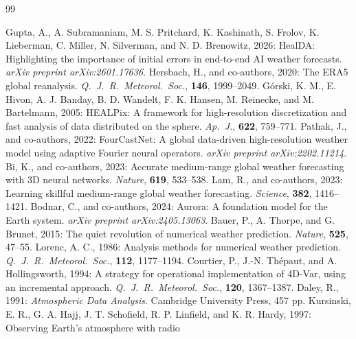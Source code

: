 \documentclass[twocolumn,11pt]{article}
\begin{document}
\begin{thebibliography}{99}\small

Gupta, A., A. Subramaniam, M. S. Pritchard, K. Kashinath,
S. Frolov, K. Lieberman, C. Miller, N. Silverman, and
N. D. Brenowitz, 2026: HealDA: Highlighting the importance of
initial errors in end-to-end AI weather forecasts.
\emph{arXiv preprint arXiv:2601.17636}.
Hersbach, H., and co-authors, 2020: The ERA5 global reanalysis.
\emph{Q.\ J.\ R.\ Meteorol.\ Soc.}, \textbf{146}, 1999--2049.
G\'orski, K. M., E. Hivon, A. J. Banday, B. D. Wandelt,
F. K. Hansen, M. Reinecke, and M. Bartelmann, 2005: HEALPix: A
framework for high-resolution discretization and fast analysis of
data distributed on the sphere. \emph{Ap.\ J.}, \textbf{622},
759--771.
Pathak, J., and co-authors, 2022: FourCastNet: A global data-driven
high-resolution weather model using adaptive Fourier neural operators.
\emph{arXiv preprint arXiv:2202.11214}.
Bi, K., and co-authors, 2023: Accurate medium-range global weather
forecasting with 3D neural networks. \emph{Nature}, \textbf{619},
533--538.
Lam, R., and co-authors, 2023: Learning skillful medium-range global
weather forecasting. \emph{Science}, \textbf{382}, 1416--1421.
Bodnar, C., and co-authors, 2024: Aurora: A foundation model for the
Earth system. \emph{arXiv preprint arXiv:2405.13063}.
Bauer, P., A. Thorpe, and G. Brunet, 2015: The quiet revolution of
numerical weather prediction. \emph{Nature}, \textbf{525}, 47--55.
Lorenc, A. C., 1986: Analysis methods for numerical weather
prediction. \emph{Q.\ J.\ R.\ Meteorol.\ Soc.}, \textbf{112},
1177--1194.
Courtier, P., J.-N. Th\'epaut, and A. Hollingsworth, 1994: A strategy
for operational implementation of 4D-Var, using an incremental
approach. \emph{Q.\ J.\ R.\ Meteorol.\ Soc.}, \textbf{120},
1367--1387.
Daley, R., 1991: \emph{Atmospheric Data Analysis}. Cambridge
University Press, 457 pp.
Kursinski, E. R., G. A. Hajj, J. T. Schofield, R. P. Linfield, and
K. R. Hardy, 1997: Observing Earth's atmosphere with radio

\end{thebibliography}
\end{document}
